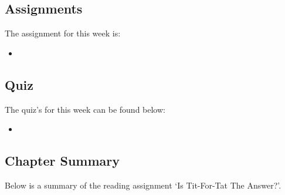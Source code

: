 \subsection{Assignments}

The assignment for this week is:

\begin{itemize}
    \item {}
\end{itemize}

\subsection{Quiz}

The quiz's for this week can be found below:

\begin{itemize}
    \item {}
\end{itemize}

\newpage

\subsection{Chapter Summary}

Below is a summary of the reading assignment `Is Tit-For-Tat The Answer?'.

